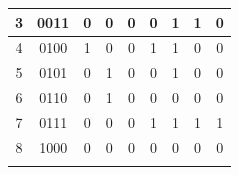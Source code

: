 \documentclass[12pt]{article}
\begin{document}
\begin{table}[ht]
\begin{tabular}{ | c | c | c | c | c | c | c | c | c | }
  3                                                                      & 0011                                                                    & 0                             & 0                             & 0                             & 0                             & 1                             & 1                             & 0                             \\ \hline \rule{0em}{1.15em}
  4                                                                      & 0100                                                                    & 1                             & 0                             & 0                             & 1                             & 1                             & 0                             & 0                             \\ \hline \rule{0em}{1.15em}
  5                                                                      & 0101                                                                    & 0                             & 1                             & 0                             & 0                             & 1                             & 0                             & 0                             \\ \hline \rule{0em}{1.15em}
  6                                                                      & 0110                                                                    & 0                             & 1                             & 0                             & 0                             & 0                             & 0                             & 0                             \\ \hline \rule{0em}{1.15em}
  7                                                                      & 0111                                                                    & 0                             & 0                             & 0                             & 1                             & 1                             & 1                             & 1                             \\ \hline \rule{0em}{1.15em}
  8                                                                      & 1000                                                                    & 0                             & 0                             & 0                             & 0                             & 0                             & 0                             & 0                             \\ \hline \rule{0em}{1.15em}

\end{tabular}
\end{table}
\end{document}
